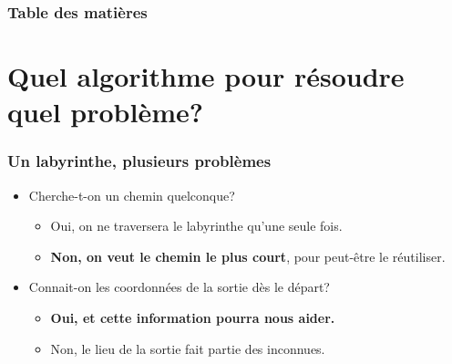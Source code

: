\documentclass[]{beamer}
\begin{document}
\begin{frame}
  \frametitle{Table des matières}
  \tableofcontents[0]
\end{frame} %

\section{Quel algorithme pour résoudre quel problème?}
\begin{frame} 
  \frametitle{Un labyrinthe, plusieurs problèmes}
  \begin{itemize}
  \item<1-> Cherche-t-on un chemin quelconque?
    \begin{itemize}
    \item Oui, on ne traversera le labyrinthe qu'une seule fois.
    \item \textbf<2->{Non, on veut le chemin le plus court},
      pour peut-être le réutiliser.
    \end{itemize}
  \item<3-> Connait-on les coordonnées de la sortie dès le départ?
    \begin{itemize}
    \item \textbf<4->{Oui, et cette information pourra nous aider.}
    \item Non, le lieu de la sortie fait partie des inconnues.
    \end{itemize}
  \end{itemize}
\end{frame} %
\end{document}
